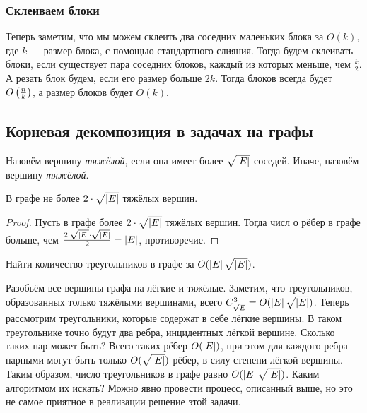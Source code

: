 \subsubsection{Склеиваем блоки}

Теперь заметим, что мы можем склеить два соседних маленьких блока за $O(k)$, где $k$ --- размер блока, с помощью стандартного слияния. Тогда будем склеивать блоки, если существует пара соседних блоков, каждый из которых меньше, чем $\frac{k}{2}$. А резать блок будем, если его размер больше $2k$. Тогда блоков всегда будет $O\left(\frac{n}{k}\right)$, а размер блоков будет $O(k)$.

\subsection{Корневая декомпозиция в задачах на графы}

\begin{definition}
    Назовём вершину \textit{тяжёлой}, если она имеет более $\sqrt{\left\lvert E\right\rvert}$ соседей. Иначе, назовём вершину \textit{тяжёлой}.
\end{definition}

\begin{lemma}
    В графе не более $2 \cdot \sqrt{\left\lvert E\right\rvert}$ тяжёлых вершин.
\end{lemma}

\begin{proof}
    Пусть в графе более $2 \cdot \sqrt{\left\lvert E\right\rvert}$ тяжёлых вершин. Тогда числ о рёбер в графе больше, чем $\frac{2 \cdot \sqrt{\left\lvert E\right\rvert} \cdot \sqrt{\left\lvert E\right\rvert}}{2} = \left\lvert E\right\rvert$, противоречие.
\end{proof}

\begin{problem}
    Найти количество треугольников в графе за $O(\left\lvert E\right\rvert\sqrt{\left\lvert E\right\rvert})$.
\end{problem}

Разобьём все вершины графа на лёгкие и тяжёлые. Заметим, что треугольников, образованных только тяжёлыми вершинами, всего $C_{\sqrt{E}}^3 \hm = O(\abs{E}\sqrt{\abs{E}})$. Теперь рассмотрим треугольники, которые содержат в себе лёгкие вершины. В таком треугольнике точно будут два ребра, инцидентных лёгкой вершине. Сколько таких пар может быть? Всего таких рёбер $O(\left\lvert E\right\rvert)$, при этом для каждого ребра парными могут быть только $O(\sqrt{\left\lvert E\right\rvert})$ рёбер, в силу степени лёгкой вершины. Таким образом, число треугольников в графе равно $O(\left\lvert E\right\rvert\sqrt{\left\lvert E\right\rvert})$. Каким алгоритмом их искать? Можно явно провести процесс, описанный выше, но это не самое приятное в реализации решение этой задачи.


